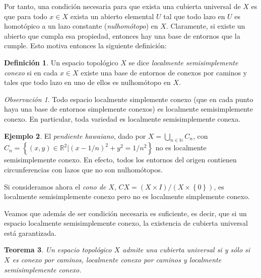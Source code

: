 \documentclass[12pt,a4paper]{book}
\newtheorem{thm}{Teorema}[section]
\theoremstyle{definition} \newtheorem{defn}[thm]{Definición}
\theoremstyle{definition} \newtheorem{ejemplo}[thm]{Ejemplo}
\theoremstyle{definition} \newtheorem{ejercicio}[thm]{Ejercicio}
\theoremstyle{remark} \newtheorem*{obs}{Observación}
\def\RR{\mathbb{R}}
\def\NN{\mathbb{N}}
\begin{document}
Por tanto, una condición necesaria para que exista una cubierta universal de $X$ es que para todo $x\in X$ exista un abierto elemental $U$ tal que todo lazo en $U$ es homotópico a un lazo constante (\emph{nulhomótopo}) en $X$. Claramente, si existe un abierto que cumpla esa propiedad, entonces hay una base de entornos que la cumple. Esto motiva entonces la siguiente definición:

\begin{defn}
  Un espacio topológico $X$ se dice \emph{localmente semisimplemente conexo} si en cada $x\in X$ existe una base de entornos de conexos por caminos y tales que todo lazo en uno de ellos es nulhomótopo en $X$.
\end{defn}

\begin{obs}
  Todo espacio localmente simplemente conexo (que en cada punto haya una base de entornos simplemente conexos) es localmente semisimplemente conexo. En particular, toda variedad es localmente semisimplemente conexa.
\end{obs}

\begin{ejemplo}
  El \emph{pendiente hawaiano}, dado por $X=\bigcup_{n\in \NN}C_n$, con $C_n=\left\{ (x,y)\in \RR^2 | (x-1/n)^2+y^2=1/n^2 \right\}$ no es localmente semisimplemente conexo. En efecto, todos los entornos del origen contienen circunferencias con lazos que no son nulhomótopos.

  Si consideramos ahora el \emph{cono de $X$}, $CX=(X\times I)/(X\times\left\{ 0 \right\})$, es localmente semisimplemente conexo pero no es localmente simplemente conexo.
\end{ejemplo}

Veamos que además de ser condición necesaria es suficiente, es decir, que si un espacio localmente semisimplemente conexo, la existencia de cubierta universal está garantizada.

\begin{thm}\label{cubuni}
  Un espacio topológico $X$ admite una cubierta universal si y sólo si $X$ es conexo por caminos, localmente conexo por caminos y localmente semisimplemente conexo.
\end{thm}
\end{document}
